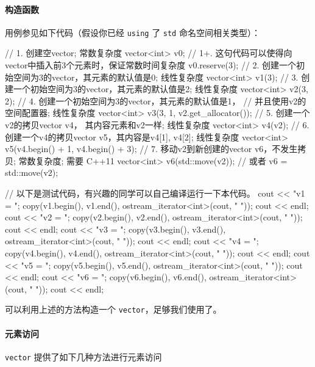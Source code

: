 \paragraph{构造函数}\label{ux6784ux9020ux51fdux6570}

用例参见如下代码（假设你已经 \texttt{using} 了 \texttt{std} 命名空间相关类型）：


\begin{codeline}
// 1. 创建空vector; 常数复杂度
vector<int> v0;
// 1+. 这句代码可以使得向vector中插入前3个元素时，保证常数时间复杂度
v0.reserve(3);
// 2. 创建一个初始空间为3的vector，其元素的默认值是0; 线性复杂度
vector<int> v1(3);
// 3. 创建一个初始空间为3的vector，其元素的默认值是2; 线性复杂度
vector<int> v2(3, 2);
// 4. 创建一个初始空间为3的vector，其元素的默认值是1，
// 并且使用v2的空间配置器; 线性复杂度
vector<int> v3(3, 1, v2.get_allocator());
// 5. 创建一个v2的拷贝vector v4， 其内容元素和v2一样; 线性复杂度
vector<int> v4(v2);
// 6. 创建一个v4的拷贝vector v5，其内容是{v4[1], v4[2]}; 线性复杂度
vector<int> v5(v4.begin() + 1, v4.begin() + 3);
// 7. 移动v2到新创建的vector v6，不发生拷贝; 常数复杂度; 需要 C++11
vector<int> v6(std::move(v2));  // 或者 v6 = std::move(v2);
\end{codeline}
\begin{codeline}
// 以下是测试代码，有兴趣的同学可以自己编译运行一下本代码。
cout << "v1 = ";
copy(v1.begin(), v1.end(), ostream_iterator<int>(cout, " "));
cout << endl;
cout << "v2 = ";
copy(v2.begin(), v2.end(), ostream_iterator<int>(cout, " "));
cout << endl;
cout << "v3 = ";
copy(v3.begin(), v3.end(), ostream_iterator<int>(cout, " "));
cout << endl;
cout << "v4 = ";
copy(v4.begin(), v4.end(), ostream_iterator<int>(cout, " "));
cout << endl;
cout << "v5 = ";
copy(v5.begin(), v5.end(), ostream_iterator<int>(cout, " "));
cout << endl;
cout << "v6 = ";
copy(v6.begin(), v6.end(), ostream_iterator<int>(cout, " "));
cout << endl;
\end{codeline}


可以利用上述的方法构造一个 \texttt{vector}，足够我们使用了。

\paragraph{元素访问}\label{ux5143ux7d20ux8bbfux95ee}

\texttt{vector} 提供了如下几种方法进行元素访问

